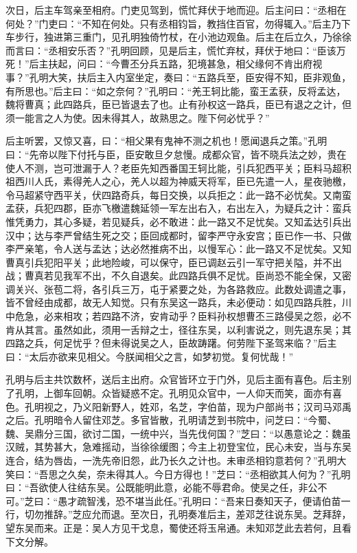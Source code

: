 次日，后主车驾亲至相府。门吏见驾到，慌忙拜伏于地而迎。后主问曰：“丞相在何处？”门吏曰：“不知在何处。只有丞相钧旨，教挡住百官，勿得辄入。”后主乃下车步行，独进第三重门，见孔明独倚竹杖，在小池边观鱼。后主在后立久，乃徐徐而言曰：“丞相安乐否？”孔明回顾，见是后主，慌忙弃杖，拜伏于地曰：“臣该万死！”后主扶起，问曰：“今曹丕分兵五路，犯境甚急，相父缘何不肯出府视事？”孔明大笑，扶后主入内室坐定，奏曰：“五路兵至，臣安得不知，臣非观鱼，有所思也。”后主曰：“如之奈何？”孔明曰：“羌王轲比能，蛮王孟获，反将孟达，魏将曹真；此四路兵，臣已皆退去了也。止有孙权这一路兵，臣已有退之之计，但须一能言之人为使。因未得其人，故熟思之。陛下何必忧乎？”

后主听罢，又惊又喜，曰：“相父果有鬼神不测之机也！愿闻退兵之策。”孔明曰：“先帝以陛下付托与臣，臣安敢旦夕怠慢。成都众官，皆不晓兵法之妙，贵在使人不测，岂可泄漏于人？老臣先知西番国王轲比能，引兵犯西平关；臣料马超积祖西川人氏，素得羌人之心，羌人以超为神威天将军，臣已先遣一人，星夜驰檄，令马超紧守西平关，伏四路奇兵，每日交换，以兵拒之：此一路不必忧矣。又南蛮孟获，兵犯四郡，臣亦飞檄遣魏延领一军左出右入，右出左入，为疑兵之计：蛮兵惟凭勇力，其心多疑，若见疑兵，必不敢进：此一路又不足忧矣。又知孟达引兵出汉中；达与李严曾结生死之交；臣回成都时，留李严守永安宫；臣已作一书、只做李严亲笔，令人送与孟达；达必然推病不出，以慢军心：此一路又不足忧矣。又知曹真引兵犯阳平关；此地险峻，可以保守，臣已调赵云引一军守把关隘，并不出战；曹真若见我军不出，不久自退矣。此四路兵俱不足忧。臣尚恐不能全保，又密调关兴、张苞二将，各引兵三万，屯于紧要之处，为各路救应。此数处调遣之事，皆不曾经由成都，故无人知觉。只有东吴这一路兵，未必便动：如见四路兵胜，川中危急，必来相攻；若四路不济，安肯动乎？臣料孙权想曹丕三路侵吴之怨，必不肯从其言。虽然如此，须用一舌辩之士，径往东吴，以利害说之，则先退东吴；其四路之兵，何足忧乎？但未得说吴之人，臣故踌躇。何劳陛下圣驾来临？”后主曰：“太后亦欲来见相父。今朕闻相父之言，如梦初觉。复何忧哉！”

孔明与后主共饮数杯，送后主出府。众官皆环立于门外，见后主面有喜色。后主别了孔明，上御车回朝。众皆疑惑不定。孔明见众官中，一人仰天而笑，面亦有喜色。孔明视之，乃义阳新野人，姓邓，名芝，字伯苗，现为户部尚书；汉司马邓禹之后。孔明暗令人留住邓芝。多官皆散，孔明请芝到书院中，问芝曰：“今蜀、魏、吴鼎分三国，欲讨二国，一统中兴，当先伐何国？”芝曰：“以愚意论之：魏虽汉贼，其势甚大，急难摇动，当徐徐缓图；今主上初登宝位，民心未安，当与东吴连合，结为唇齿，一洗先帝旧怨，此乃长久之计也。未审丞相钧意若何？”孔明大笑曰：“吾思之久矣，奈未得其人。今日方得也！”芝曰：“丞相欲其人何为？”孔明曰：“吾欲使人往结东吴。公既能明此意，必能不辱君命。使吴之任，非公不可。”芝曰：“愚才疏智浅，恐不堪当此任。”孔明曰：“吾来日奏知天子，便请伯苗一行，切勿推辞。”芝应允而退。至次日，孔明奏准后主，差邓芝往说东吴。芝拜辞，望东吴而来。正是：吴人方见干戈息，蜀使还将玉帛通。未知邓芝此去若何，且看下文分解。